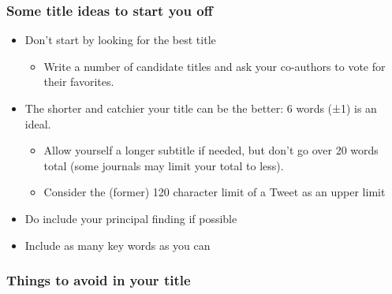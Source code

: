 \documentclass[
]{krantz}
\providecommand{\tightlist}{%
  \setlength{\itemsep}{0pt}\setlength{\parskip}{0pt}}
\begin{document}
\hypertarget{some-title-ideas-to-start-you-off}{%
\subsubsection{Some title ideas to start you off}\label{some-title-ideas-to-start-you-off}}

\begin{itemize}
\tightlist
\item
  Don't start by looking for the best title

  \begin{itemize}
  \tightlist
  \item
    Write a number of candidate titles and ask your co-authors to vote for their favorites.
  \end{itemize}
\item
  The shorter and catchier your title can be the better: 6 words (±1) is an ideal.

  \begin{itemize}
  \tightlist
  \item
    Allow yourself a longer subtitle if needed, but don't go over 20 words total (some journals may limit your total to less).
  \item
    Consider the (former) 120 character limit of a Tweet as an upper limit
  \end{itemize}
\item
  Do include your principal finding if possible
\item
  Include as many key words as you can
\end{itemize}

\hypertarget{things-to-avoid-in-your-title}{%
\subsubsection{Things to avoid in your title}\label{things-to-avoid-in-your-title}}
\end{document}

